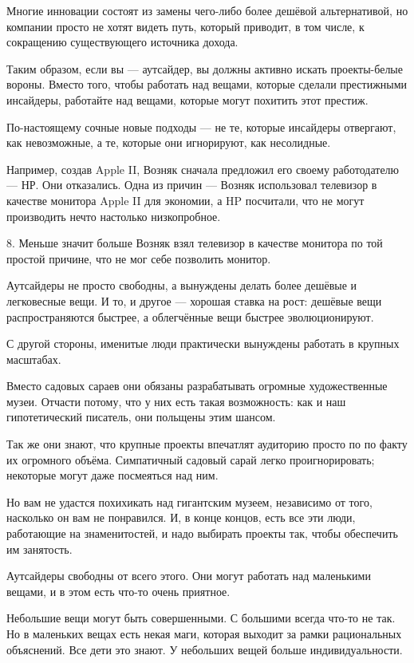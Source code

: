 \documentclass[ebook,12pt,oneside,openany]{memoir}
\begin{document}
Многие инновации состоят из замены чего-либо более дешёвой
альтернативой, но компании просто не хотят видеть путь, который
приводит, в том числе, к сокращению существующего источника дохода.

Таким образом, если вы — аутсайдер, вы должны активно искать
проекты-белые вороны. Вместо того, чтобы работать над вещами, которые
сделали престижными инсайдеры, работайте над вещами, которые могут
похитить этот престиж.

По-настоящему сочные новые подходы — не те, которые инсайдеры
отвергают, как невозможные, а те, которые они игнорируют, как
несолидные.

Например, создав Apple II, Возняк сначала предложил его своему
работодателю — НР. Они отказались. Одна из причин — Возняк использовал
телевизор в качестве монитора Apple II для экономии, а HP посчитали,
что не могут производить нечто настолько низкопробное.

8. Меньше значит больше Возняк взял телевизор в качестве монитора по
той простой причине, что не мог себе позволить монитор.

Аутсайдеры не просто свободны, а вынуждены делать более дешёвые и
легковесные вещи. И то, и другое — хорошая ставка на рост: дешёвые
вещи распространяются быстрее, а облегчённые вещи быстрее
эволюционируют.

С другой стороны, именитые люди практически вынуждены работать в
крупных масштабах.

Вместо садовых сараев они обязаны разрабатывать огромные
художественные музеи. Отчасти потому, что у них есть такая
возможность: как и наш гипотетический писатель, они польщены этим
шансом.

Так же они знают, что крупные проекты впечатлят аудиторию просто по по
факту их огромного объёма. Симпатичный садовый сарай легко
проигнорировать; некоторые могут даже посмеяться над ним.

Но вам не удастся похихикать над гигантским музеем, независимо от
того, насколько он вам не понравился. И, в конце концов, есть все эти
люди, работающие на знаменитостей, и надо выбирать проекты так, чтобы
обеспечить им занятость.

Аутсайдеры свободны от всего этого. Они могут работать над маленькими
вещами, и в этом есть что-то очень приятное.

Небольшие вещи могут быть совершенными. С большими всегда что-то не
так. Но в маленьких вещах есть некая маги, которая выходит за рамки
рациональных объяснений. Все дети это знают. У небольших вещей больше
индивидуальности.
\end{document}
